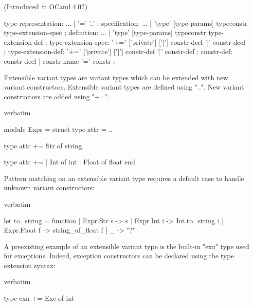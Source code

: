 {(Introduced in OCaml 4.02)

\begin{syntax}
type-representation:
          ...
        | '=' '..'
;
specification:
        ...
      | 'type' [type-params] typeconstr type-extension-spec
;
definition:
        ...
      | 'type' [type-params] typeconstr type-extension-def
;
type-extension-spec: '+=' ['private'] ['|'] constr-decl { '|' constr-decl }
;
type-extension-def: '+=' ['private'] ['|'] constr-def { '|' constr-def }
;
constr-def:
          constr-decl
        | constr-name '=' constr
;
\end{syntax}

Extensible variant types are variant types which can be extended with
new variant constructors. Extensible variant types are defined using
"..". New variant constructors are added using "+=".
\begin{camlexample}{verbatim}
\begin{caml}
\begin{camlinput}
module Expr = struct
  type attr = ..

  type attr += Str of string

  type attr +=
    | Int of int
    | Float of float
end
\end{camlinput}
\end{caml}
\end{camlexample}

Pattern matching on an extensible variant type requires a default case
to handle unknown variant constructors:
\begin{camlexample}{verbatim}
\begin{caml}
\begin{camlinput}
let to_string = function
  | Expr.Str s -> s
  | Expr.Int i -> Int.to_string i
  | Expr.Float f -> string_of_float f
  | _ -> "?"
\end{camlinput}
\end{caml}
\end{camlexample}

A preexisting example of an extensible variant type is the built-in
"exn" type used for exceptions. Indeed, exception constructors can be
declared using the type extension syntax:
\begin{camlexample}{verbatim}
\begin{caml}
\begin{camlinput}
type exn += Exc of int
\end{camlinput}
\end{caml}
\end{camlexample}

}
